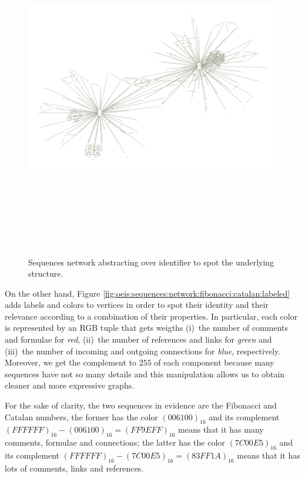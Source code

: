\begin{figure}
\includegraphics[width=15cm, height=15cm]{OEIS/points}
\caption{Sequences network abstracting over identifier to spot the underlying
structure.}
\label{fig:oeis:sequences:network:fibonacci:catalan}
\end{figure}

\begin{example}
On the other hand, Figure
\ref{fig:oeis:sequences:network:fibonacci:catalan:labeled} adds labels and
colors to vertices in order to spot their identity and their relevance
according to a combination of their properties. In particular, each color is
represented by an RGB tuple that gets weigths (i)~the number of comments and
formulae for \textit{red}, (ii)~the number of references and links for
\textit{green} and (iii)~the number of incoming and outgoing connections for
\textit{blue}, respectively. Moreover, we get the complement to $255$ of each
component because many sequences have not so many details and this manipulation
allows us to obtain cleaner and more expressive graphs.

For the sake of clarity, the two sequences in evidence are the Fibonacci and
Catalan numbers, the former has the color $(006100)_{16}$ and its complement
$(FFFFFF)_{16}-(006100)_{16}=(FF9EFF)_{16}$ means that it has many comments,
formulae and connections; the latter has the color $(7C00E5)_{16}$ and its
complement $(FFFFFF)_{16}-(7C00E5)_{16}=(83FF1A)_{16}$ means that it has lots
of comments, links and references.
\end{example}


